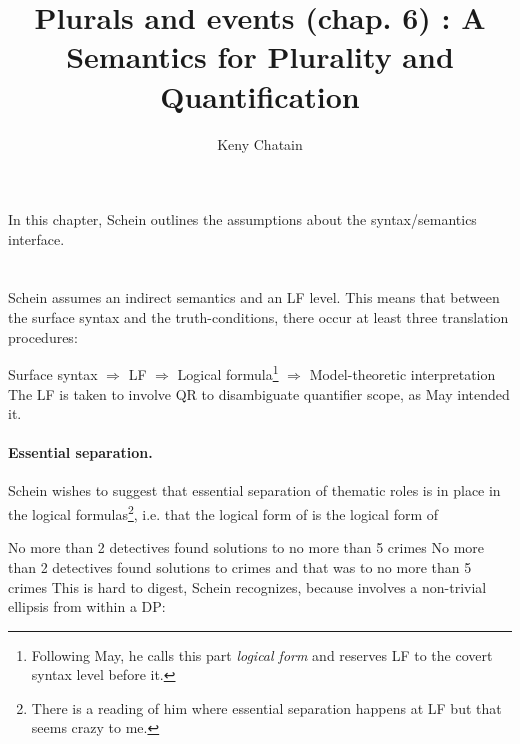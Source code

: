 


\endofdump


\newcommand{\scale}1

\title{Plurals and events (chap. 6) : A Semantics for Plurality and Quantification}
\author{Keny Chatain}


\maketitle

In this chapter, Schein outlines the assumptions about the syntax/semantics interface.

\section{}

Schein assumes an indirect semantics and an LF level. This means that between the surface syntax and the truth-conditions, there occur at least three translation procedures:

\ex
Surface syntax $\Rightarrow$ LF $\Rightarrow$ Logical formula\footnote{Following May, he calls this part \emph{logical form} and reserves LF to the covert syntax level before it.} $\Rightarrow$ Model-theoretic interpretation
\xe
%
The LF is taken to involve QR to disambiguate quantifier scope, as May intended it.

\paragraph{Essential separation.} Schein wishes to suggest that essential separation of thematic roles is in place in the logical formulas\footnote{There is a reading of him where essential separation happens at LF but that seems crazy to me.}, i.e. that the logical form of \cnextx[a] is the logical form of \cnextx[b]

\pex \label{nomore}
\a No more than 2 detectives found solutions to no more than 5 crimes
\a No more than 2 detectives found solutions to crimes and that was to no more than 5 crimes
\xe
%
This is hard to digest, Schein recognizes, because  involves a non-trivial ellipsis from within a DP:

